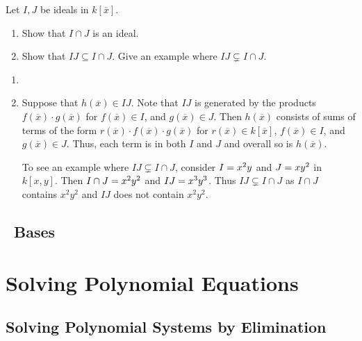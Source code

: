 \documentclass[letterpaper, 11pt, oneside]{book}
\begin{document}
\clearpage

\begin{exercise}\label{ex:UAG_1.1.12}
  Let $I, J$ be ideals in $k[\overline{x}]$.
  \begin{enumerate}[label= (\alph*)]
    \item Show that $I \cap J$ is an ideal.
    \item Show that $IJ \subseteq I \cap J$.
          Give an example where $IJ \subsetneq I \cap J$.
  \end{enumerate}
\end{exercise}
\begin{pf}
  \begin{enumerate}[label= (\alph*)]
    \item {}
    \item Suppose that $h(\overline{x}) \in IJ$.
          Note that $IJ$ is generated by the products $f(\overline{x}) \cdot g(\overline{x})$ for $f(\overline{x}) \in I$, and $g(\overline{x}) \in J$.
          Then $h(\overline{x})$ consists of sums of terms of the form $r(\overline{x}) \cdot f(\overline{x}) \cdot g(\overline{x})$ for $r(\overline{x}) \in k[\overline{x}]$, $f(\overline{x}) \in I$, and $g(\overline{x}) \in J$.
          Thus, each term is in both $I$ and $J$ and overall so is $h(\overline{x})$.

          To see an example where $IJ \subsetneq I \cap J$, consider $I = \ideal{x^{2}y}$ and $J = \ideal{xy^{2}}$ in $k[x, y]$.
          Then $I \cap J = \gen{x^{2}y^{2}}$ and $IJ = \gen{x^{3}y^{3}}$.
          Thus $IJ \subsetneq I \cap J$ as $I \cap J$ contains $x^{2}y^{2}$ and $IJ$ does not contain $x^{2}y^{2}$.
  \end{enumerate}
\end{pf}

\section{\Grobner\ Bases}

\begin{exercise}\label{ex:UAG_1.3.11}

\end{exercise}


\chapter{Solving Polynomial Equations}

\section{Solving Polynomial Systems by Elimination}
\end{document}
